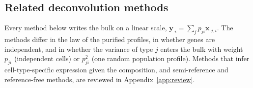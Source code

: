 \documentclass[pdflatex, sn-nature]{sn-jnl}
\theoremstyle{thmstyleone}%
\theoremstyle{thmstyletwo}%
\theoremstyle{thmstylethree}%
\begin{document}
\subsection{Related deconvolution methods}
\label{sec:gap}



Every method below writes the bulk on a linear scale,
\(\boldsymbol{y}_{\cdot i}=\sum_{j}p_{ji}\boldsymbol{x}_{\cdot j,i}\).
The methods differ in the law of the purified profiles, in whether genes are
independent, and in whether the variance of type \(j\) enters the bulk with
weight \(p_{ji}\) (independent cells) or \(p_{ji}^{2}\) (one random population
profile).
Methods that infer cell-type-specific expression given the composition, and
semi-reference and reference-free methods, are reviewed in Appendix~\ref{app:review}.
\end{document}
